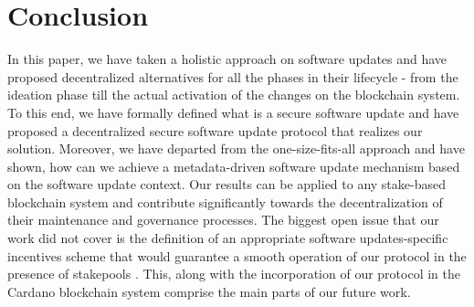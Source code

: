 \section{Conclusion}
In this paper, we have taken a holistic approach on software updates and have proposed decentralized alternatives for all the phases in their lifecycle - from the ideation phase till the actual activation of the changes on the blockchain system. To this end, we have formally defined what is a secure software update and have proposed a decentralized secure software update protocol that realizes our solution. Moreover, we have departed from the one-size-fits-all approach and have shown, how can we achieve a metadata-driven software update mechanism based on the software update context. Our results can be applied to any stake-based blockchain system and contribute significantly towards the decentralization of their maintenance and governance processes. The biggest open issue that our work did not cover is the definition of an appropriate software updates-specific incentives scheme that would guarantee a smooth operation of our protocol in the presence of stakepools \cite{stakepools}. This, along with the incorporation of our protocol in the Cardano blockchain system \cite{cardano} comprise the main parts of our future work.